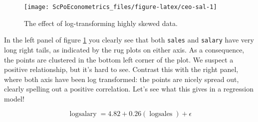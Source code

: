 \documentclass[]{book}
\newenvironment{Shaded}{\begin{snugshade}}{\end{snugshade}}
\newcommand{\DataTypeTok}[1]{\textcolor[rgb]{0.13,0.29,0.53}{#1}}
\newcommand{\DecValTok}[1]{\textcolor[rgb]{0.00,0.00,0.81}{#1}}
\newcommand{\KeywordTok}[1]{\textcolor[rgb]{0.13,0.29,0.53}{\textbf{#1}}}
\newcommand{\NormalTok}[1]{#1}
\newcommand{\OperatorTok}[1]{\textcolor[rgb]{0.81,0.36,0.00}{\textbf{#1}}}
\newcommand{\OtherTok}[1]{\textcolor[rgb]{0.56,0.35,0.01}{#1}}
\newcommand{\StringTok}[1]{\textcolor[rgb]{0.31,0.60,0.02}{#1}}
\begin{document}
\begin{Shaded}
\end{Shaded}

\begin{figure}

{\centering \texttt{[image: ScPoEconometrics\_files/figure-latex/ceo-sal-1]} 

}

\caption{The effect of log-transforming highly skewed data.}\label{fig:ceo-sal}
\end{figure}

In the left panel of figure \ref{fig:ceo-sal} you clearly see that both \texttt{sales} and \texttt{salary} have very long right tails, as indicated by the rug plots on either axis. As a consequence, the points are clustered in the bottom left corner of the plot. We suspect a positive relationship, but it's hard to see. Contrast this with the right panel, where both axis have been log transformed: the points are nicely spread out, clearly spelling out a positive correlation. Let's see what this gives in a regression model!

\[
\operatorname{logsalary} = 4.82 + 0.26(\operatorname{logsales}) + \epsilon
\]
\end{document}
